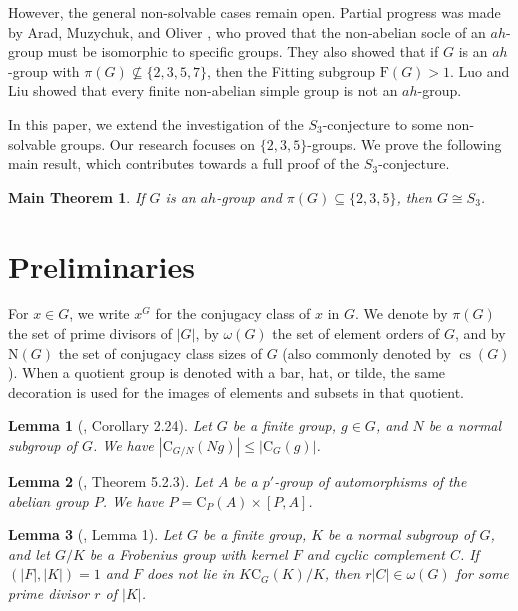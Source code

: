 \documentclass[11pt]{article}
\providecommand{\N}{{\mathrm{N}}}
\providecommand{\C}{{\mathrm{C}}}
\providecommand{\F}{{\mathrm{F}}}
\newtheorem{lem}{Lemma}
\newtheorem*{maintheorem}{Main Theorem}
\begin{document}
    However, the general non-solvable cases remain open. 
    Partial progress was made by Arad, Muzychuk, and Oliver \cite{Arad2004B}, 
    who proved that the non-abelian socle of an $ah$-group must be isomorphic to specific groups. 
    They also showed that if $G$ is an $ah$-group with $\pi(G) \not\subseteq \{2,3,5,7\}$, 
    then the Fitting subgroup $\F(G) > 1$.
    Luo and Liu \cite{LuoLiu2019} showed that every finite non-abelian simple group is not an $ah$-group.

    In this paper, we extend the investigation of the $S_3$-conjecture to some non-solvable groups. 
    Our research focuses on $\{2, 3, 5\}$-groups. 
    We prove the following main result, 
    which contributes towards a full proof of the $S_3$-conjecture.

\begin{maintheorem}
If $G$ is an $ah$-group and $\pi(G)\subseteq\{2,3,5\}$, then $G\cong S_3$.
\end{maintheorem}


\section{Preliminaries}

    For $x\in G$, we write $x^G$ for the conjugacy class of $x$ in $G$.
    We denote by $\pi(G)$ the set of prime divisors of $|G|$, by $\omega(G)$ the set of element orders of $G$,
    and by $\N(G)$ the set of conjugacy class sizes of $G$ (also commonly denoted by $\operatorname{cs}(G)$).
    When a quotient group is denoted with a bar, hat, or tilde, the same decoration is used
    for the images of elements and subsets in that quotient.

\begin{lem}[\cite{Isaacs1976}, Corollary 2.24]
\label{Centre}
    Let $G$ be a finite group, $g\in G$, and $N$ be a normal subgroup of $G$.
    We have $|\C_{G/N}(Ng)|\leq |\C_G(g)|$.
\end{lem}

\begin{lem}[\cite{Gorenstein}, Theorem 5.2.3]
\label{Go}
    Let $A$ be a $p'$-group of automorphisms of the abelian group $P$. 
    We have $P=\C_P(A)\times[P,A]$.
\end{lem}

\begin{lem}[\cite{Mazurov1997}, Lemma 1]
\label{Frob}
    Let $G$ be a finite group, $K$ be a normal subgroup of $G$,
    and let $G/K$ be a Frobenius group with kernel $F$ and cyclic complement $C$.
    If $(|F|,|K|)=1$ and $F$ does not lie in $K\C_G(K)/K$, 
    then $r|C|\in \omega (G)$ for some prime divisor $r$ of $|K|$.
\end{lem}
\end{document}
